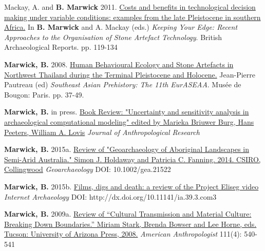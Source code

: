 \documentclass[11pt,article,oneside]{memoir}
\begin{document}
{{{{\ind Mackay, A. and \textbf{B. Marwick} 2011. \href{http://faculty.washington.edu/bmarwick/PDFs/Mackay_and_Marwick_2011_timecost.pdf}{Costs and benefits in technological decision making under variable conditions: examples from the late Pleistocene in southern Africa.} In \textbf{B. Marwick} and A. Mackay (eds.) \textit{Keeping Your Edge: Recent Approaches to the Organisation of Stone Artefact Technology}. British Archaeological Reports.  pp. 119-134

\ind \textbf{Marwick, B.} 2008. \href{http://faculty.washington.edu/bmarwick/PDFs/Marwick_2008_EurASEAA.pdf}{Human Behavioural Ecology and Stone Artefacts in Northwest Thailand during the Terminal Pleistocene and Holocene.} Jean-Pierre Pautreau (ed) \textit{Southeast Asian Prehistory: The 11th EurASEAA}. Musée de Bougon: Paris. pp. 37-49.

\bigskip


\ind \textbf{Marwick, B.} in press. \href{https://osf.io/preprints/socarxiv/v5du3/}{Book Review: "Uncertainty and sensitivity analysis in archaeological computational modeling" edited by Marieka Briuwer Burg, Hans Peeters, William A. Lovis} \textit{Journal of Anthropological Research}
} 

\ind \textbf{Marwick, B.} 2015a. \href{https://www.academia.edu/15214960/Review_of_Geoarchaeology_of_Aboriginal_Landscapes_in_Semi-Arid_Australia._Simon_J._Holdaway_and_Patricia_C._Fanning._2014._CSIRO_Collingwood._Geoarchaeology_Article_first_published_online_26_AUG_2015_DOI_10.1002_gea.21522}{Review of "Geoarchaeology of Aboriginal Landscapes in Semi-Arid Australia." Simon J. Holdaway and Patricia C. Fanning. 2014. CSIRO, Collingwood} \textit{Geoarchaeology}  DOI: 10.1002/gea.21522

\ind \textbf{Marwick, B.} 2015b. \href{http://intarch.ac.uk/journal/issue39/3/comms.cfm#tabs-3}{Films, digs and death: a review of the Project Eliseg video} \textit{Internet Archaeology} DOI: http://dx.doi.org/10.11141/ia.39.3.com3

\ind \textbf{Marwick, B.} 2009a. \href{http://faculty.washington.edu/bmarwick/PDFs/Marwick_2009_AA_Stark_Review.pdf}{Review of “Cultural Transmission and Material Culture: Breaking Down Boundaries.” Miriam Stark, Brenda Bowser and Lee Horne, eds. Tucson: University of Arizona Press, 2008.} \textit{American Anthropologist} 111(4): 540-541

}}}
\end{document}
